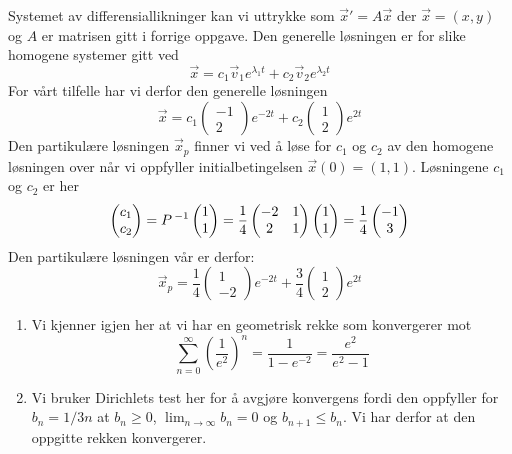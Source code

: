 \deloppgave
Systemet av differensiallikninger kan vi uttrykke som $\vec{x}' = A\vec{x}$ der $\vec{x} = (x, y)$ og $A$ er matrisen gitt i forrige oppgave. Den generelle løsningen er for slike homogene systemer gitt ved
$$
\vec{x} = c_1\vec{v}_1e^{\lambda_1 t} + c_2\vec{v}_2e^{\lambda_2 t}
$$
For vårt tilfelle har vi derfor den generelle løsningen
$$
\vec{x} = c_1\begin{pmatrix}
	-1\\2
\end{pmatrix}e^{-2t} + c_2\begin{pmatrix}
1\\2
\end{pmatrix}e^{2t}
$$
Den partikulære løsningen $\vec{x}_p$ finner vi ved å løse for $c_1$ og $c_2$ av den homogene løsningen over når vi oppfyller initialbetingelsen $\vec{x}(0) = (1, 1)$. Løsningene $c_1$ og $c_2$ er her
$$
\begin{pmatrix}
	c_1\\c_2
\end{pmatrix} = P\,^{-1}\begin{pmatrix}
1\\1
\end{pmatrix} = \frac{1}{4}\begin{pmatrix}
-2 & 1\\
2 & 1
\end{pmatrix}\begin{pmatrix}
1\\1
\end{pmatrix} = \frac{1}{4}\begin{pmatrix}
-1\\3
\end{pmatrix}
$$
Den partikulære løsningen vår er derfor:
$$
\vec{x}_p = \frac{1}{4}\begin{pmatrix}
	1\\-2
\end{pmatrix}e^{-2t} + \frac{3}{4}\begin{pmatrix}
	1\\2
\end{pmatrix}e^{2t}
$$

\oppgave
\deloppgave
\begin{enumerate}
	\item Vi kjenner igjen her at vi har en geometrisk rekke som konvergerer mot
	$$
	\sum_{n = 0}^\infty \left(\frac{1}{e^2}\right)^n = \frac{1}{1 - e^{-2}} = \frac{e^2}{e^2 - 1}
	$$
	
	\item Vi bruker Dirichlets test her for å avgjøre konvergens fordi den oppfyller for $b_n = 1/3n$ at $b_n \geq 0$, $\lim_{n\to\infty} b_n = 0$ og $b_{n+1} \leq b_n$. Vi har derfor at den oppgitte rekken konvergerer.
\end{enumerate}

